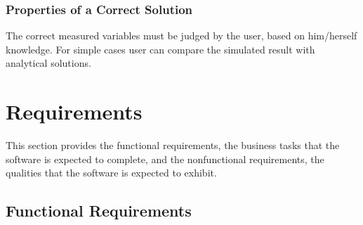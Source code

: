 \documentclass[12pt]{article}
\begin{document}
\subsubsection{Properties of a Correct Solution} \label{sec_CorrectSolution}

The correct measured variables must be judged by the user, based on him/herself knowledge. For simple cases user can compare the simulated result with analytical solutions.



\section{Requirements}


This section provides the functional requirements, the business tasks that the
software is expected to complete, and the nonfunctional requirements, the
qualities that the software is expected to exhibit.

\subsection{Functional Requirements}
\end{document}
